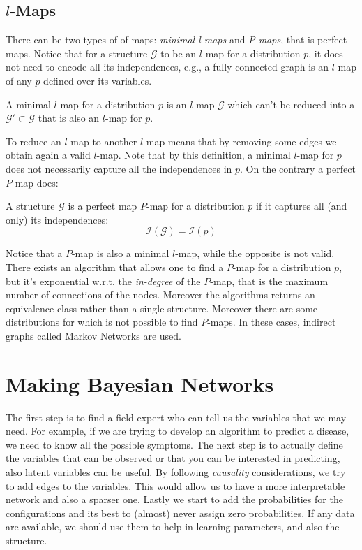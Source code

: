 \subsection{$l$-Maps}
There can be two types of of maps: \textit{minimal l-maps} and \textit{P-maps}, that is perfect maps. \newline
Notice that for a structure $\mathcal{G}$ to be an $l$-map for a distribution $p$, it does not need to encode all its independences, e.g., a fully connected graph is an $l$-map of any $p$ defined over its variables.
\begin{definition}
  A minimal $l$-map for a distribution $p$ is an $l$-map $\mathcal{G}$ which can't be reduced into a $\mathcal{G}'\subset \mathcal{G}$ that is also an $l$-map for $p$.
\end{definition}
To reduce an $l$-map to another $l$-map means that by removing some edges we obtain again a valid $l$-map. \newline
Note that by this definition, a minimal $l$-map for $p$ does not necessarily capture all the independences in $p$. On the contrary a perfect $P$-map does:
\begin{definition}[$P$-Map]
  A structure $\mathcal{G}$ is a perfect map $P$-map for a distribution $p$ if it captures all (and only) its independences:
  \[\mathcal{I}(\mathcal{G})=\mathcal{I}(p)\]
\end{definition}
Notice that a $P$-map is also a minimal $l$-map, while the opposite is not valid. \newline
There exists an algorithm that allows one to find a $P$-map for a distribution $p$, but it's exponential w.r.t. the \textit{in-degree} of the $P$-map, that is the maximum number of connections of the nodes. Moreover the algorithms returns an equivalence class rather than a single structure. \newline
Moreover there are some distributions for which is not possible to find $P$-maps. In these cases, indirect graphs called Markov Networks are used.
%
%
%
\section{Making Bayesian Networks}
The first step is to find a field-expert who can tell us the variables that we may need. For example, if we are trying to develop an algorithm to predict a disease, we need to know all the possible symptoms. \newline
The next step is to actually define the variables that can be observed or that you can be interested in predicting, also latent variables can be useful. \newline
By following \textit{causality} considerations, we try to add edges to the variables. This would allow us to have a more interpretable network and also a sparser one. \newline
Lastly we start to add the probabilities for the configurations and its best to (almost) never assign zero probabilities. If any data are available, we should use them to help in learning parameters, and also the structure. 
%
%
%
